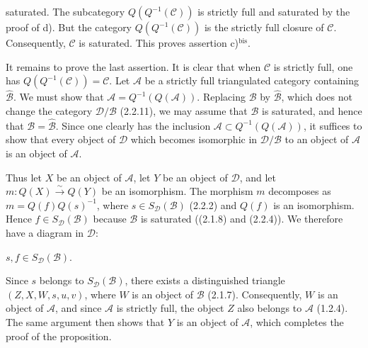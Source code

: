 \clearpage
{}%
\begingroup
\small
\setlength{\parskip}{0pt}%
\setlength{\emergencystretch}{1.5em}%
\setlength{\abovedisplayskip}{3pt plus 1pt minus 1pt}%
\setlength{\belowdisplayskip}{3pt plus 1pt minus 1pt}%

\noindent saturated. The subcategory $Q(Q^{-1}(\mathcal C))$ is strictly
full and saturated by the proof of d). But the category
$Q(Q^{-1}(\mathcal C))$ is the strictly full closure of $\mathcal C$.
Consequently, $\mathcal C$ is saturated. This proves assertion
c)$^{\mathrm{bis}}$.

It remains to prove the last assertion. It is clear that when $\mathcal C$
is strictly full, one has $Q(Q^{-1}(\mathcal C))=\mathcal C$. Let
$\mathcal A$ be a strictly full triangulated category containing
$\widehat{\mathcal B}$. We must show that
$\mathcal A=Q^{-1}(Q(\mathcal A))$. Replacing $\mathcal B$ by
$\widehat{\mathcal B}$, which does not change the category
$\mathcal D/\mathcal B$ (2.2.11), we may assume that $\mathcal B$ is
saturated, and hence that $\mathcal B=\widehat{\mathcal B}$. Since one
clearly has the inclusion
$\mathcal A\subset Q^{-1}(Q(\mathcal A))$, it suffices to show that every
object of $\mathcal D$ which becomes isomorphic in $\mathcal D/\mathcal B$
to an object of $\mathcal A$ is an object of $\mathcal A$.

Thus let $X$ be an object of $\mathcal A$, let $Y$ be an object of
$\mathcal D$, and let $m\colon Q(X)\xrightarrow{\sim}Q(Y)$ be an
isomorphism. The morphism $m$ decomposes as $m=Q(f)Q(s)^{-1}$, where
$s\in S_{\mathcal D}(\mathcal B)$ (2.2.2) and $Q(f)$ is an isomorphism.
Hence $f\in S_{\mathcal D}(\mathcal B)$ because $\mathcal B$ is saturated
((2.1.8) and (2.2.4)). We therefore have a diagram in $\mathcal D$:

\begin{center}
  \qquad $s,f\in S_{\mathcal D}(\mathcal B)$\quad .
\end{center}

Since $s$ belongs to $S_{\mathcal D}(\mathcal B)$, there exists a
distinguished triangle $(Z,X,W,s,u,v)$, where $W$ is an object of
$\mathcal B$ (2.1.7). Consequently, $W$ is an object of $\mathcal A$, and
since $\mathcal A$ is strictly full, the object $Z$ also belongs to
$\mathcal A$ (1.2.4). The same argument then shows that $Y$ is an object of
$\mathcal A$, which completes the proof of the proposition.

